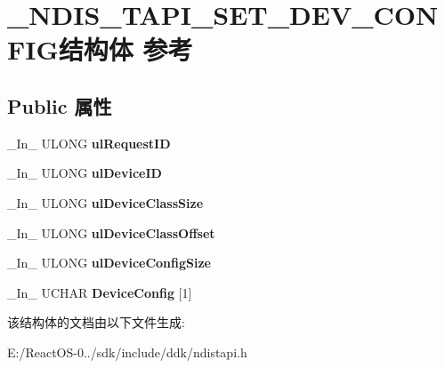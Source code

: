 \hypertarget{struct___n_d_i_s___t_a_p_i___s_e_t___d_e_v___c_o_n_f_i_g}{}\section{\+\_\+\+N\+D\+I\+S\+\_\+\+T\+A\+P\+I\+\_\+\+S\+E\+T\+\_\+\+D\+E\+V\+\_\+\+C\+O\+N\+F\+I\+G结构体 参考}
\label{struct___n_d_i_s___t_a_p_i___s_e_t___d_e_v___c_o_n_f_i_g}
\subsection*{Public 属性}
\begin{DoxyCompactItemize}
\item 
\mbox{\label{struct___n_d_i_s___t_a_p_i___s_e_t___d_e_v___c_o_n_f_i_g_a233927ff35bdd8c83281c2388700b456}} 
\+\_\+\+In\+\_\+ U\+L\+O\+NG {\bfseries ul\+Request\+ID}
\item 
\mbox{\label{struct___n_d_i_s___t_a_p_i___s_e_t___d_e_v___c_o_n_f_i_g_a8cfd11fd6057f1e2f5cc61b6ae3da335}} 
\+\_\+\+In\+\_\+ U\+L\+O\+NG {\bfseries ul\+Device\+ID}
\item 
\mbox{\label{struct___n_d_i_s___t_a_p_i___s_e_t___d_e_v___c_o_n_f_i_g_a15847a16ee8ca5b06c65a18f1715edca}} 
\+\_\+\+In\+\_\+ U\+L\+O\+NG {\bfseries ul\+Device\+Class\+Size}
\item 
\mbox{\label{struct___n_d_i_s___t_a_p_i___s_e_t___d_e_v___c_o_n_f_i_g_ade2b5090b5e3f63b26d37a117777e73c}} 
\+\_\+\+In\+\_\+ U\+L\+O\+NG {\bfseries ul\+Device\+Class\+Offset}
\item 
\mbox{\label{struct___n_d_i_s___t_a_p_i___s_e_t___d_e_v___c_o_n_f_i_g_a686c6c2770a763f96acfef8eb5e0a5e8}} 
\+\_\+\+In\+\_\+ U\+L\+O\+NG {\bfseries ul\+Device\+Config\+Size}
\item 
\mbox{\label{struct___n_d_i_s___t_a_p_i___s_e_t___d_e_v___c_o_n_f_i_g_a3648179f6b814547dabde4b0e8ae763b}} 
\+\_\+\+In\+\_\+ U\+C\+H\+AR {\bfseries Device\+Config} \mbox{[}1\mbox{]}
\end{DoxyCompactItemize}


该结构体的文档由以下文件生成\+:\begin{DoxyCompactItemize}
\item 
E\+:/\+React\+O\+S-\/0../sdk/include/ddk/ndistapi.\+h\end{DoxyCompactItemize}
